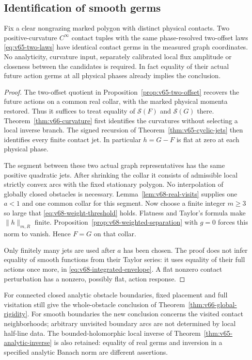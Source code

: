 \subsection{Identification of smooth germs}

\begin{theorem}
\label{thm:v68-smooth-rigidity}
Fix a clear nongrazing marked polygon with distinct physical contacts.
Two positive-curvature $C^\infty$ contact tuples with the same
phase-resolved two-offset laws \eqref{eq:v65-two-laws} have identical
contact germs in the measured graph coordinates.  No analyticity,
curvature input, separately calibrated local flux amplitude or
closeness between the candidates is required.  In fact equality of their actual future action germs at all
physical phases already implies the conclusion.
\end{theorem}
\begin{proof}
The two-offset quotient in Proposition~\ref{prop:v65-two-offset}
recovers the future actions on a common real collar, with the marked
physical momenta restored.  Thus it suffices to treat equality of
$\mathcal S(F)$ and $\mathcal S(G)$ there.
Theorem~\ref{thm:v66-curvature} first identifies the curvatures
without selecting a local inverse branch.  The signed recursion of
Theorem~\ref{thm:v65-cyclic-jets} then identifies every finite contact
jet.  In particular $h=G-F$ is flat at zero at each physical phase.

The segment between these two actual graph representatives has the
same positive quadratic jets.  After shrinking the collar it consists
of admissible local strictly convex arcs with the fixed stationary
polygon.  No interpolation of globally closed obstacles is necessary.
Lemma~\ref{lem:v68-real-visits} supplies one $a<1$ and one common
collar for this segment.  Now choose a finite integer $m\ge3$ so large
that \eqref{eq:v68-weight-threshold} holds.  Flatness and Taylor's
formula make $\|h\|_{m,R}$ finite.  Proposition~\ref{prop:v68-weighted-separation}
with $g=0$ forces this norm to vanish.  Hence $F=G$ on that collar.

Only finitely many jets are used after $a$ has been chosen.  The proof
does not infer equality of smooth functions from their Taylor series:
it uses equality of their full actions once more, in
\eqref{eq:v68-integrated-envelope}.  A flat nonzero contact perturbation
has a nonzero, possibly flat, action response.
\end{proof}

For connected closed analytic obstacle boundaries, fixed placement and
full visitation still give the whole-obstacle conclusion of
Theorem~\ref{thm:v66-global-rigidity}.  For smooth boundaries the
new conclusion concerns the visited contact neighborhoods; arbitrary
unvisited boundary arcs are not determined by local half-line data.
The bounded-holomorphic local inverse of
Theorem~\ref{thm:v65-analytic-inverse} is also retained: equality of
real germs and inversion in a specified analytic Banach norm are
different assertions.

